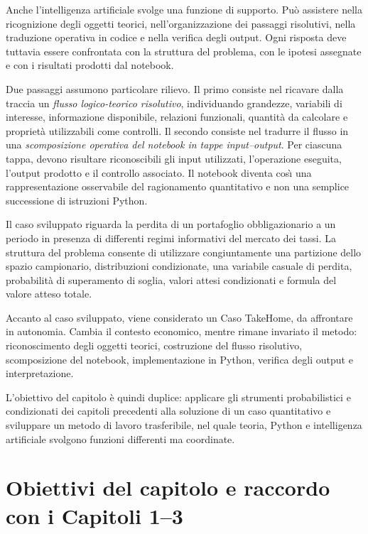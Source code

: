 Anche l'intelligenza artificiale svolge una funzione di supporto. Pu\`{o}
assistere nella ricognizione degli oggetti teorici, nell'organizzazione dei
passaggi risolutivi, nella traduzione operativa in codice e nella verifica
degli output. Ogni risposta deve tuttavia essere confrontata con la struttura
del problema, con le ipotesi assegnate e con i risultati prodotti dal
notebook.

Due passaggi assumono particolare rilievo. Il primo consiste nel ricavare
dalla traccia un \emph{flusso logico-teorico risolutivo}, individuando
grandezze, variabili di interesse, informazione disponibile, relazioni
funzionali, quantit\`{a} da calcolare e propriet\`{a} utilizzabili come
controlli. Il secondo consiste nel tradurre il flusso in una
\emph{scomposizione operativa del notebook in tappe input--output}. Per
ciascuna tappa, devono risultare riconoscibili gli input utilizzati,
l'operazione eseguita, l'output prodotto e il controllo associato. Il notebook
diventa cos\`{\i} una rappresentazione osservabile del ragionamento
quantitativo e non una semplice successione di istruzioni Python.

Il caso sviluppato riguarda la perdita di un portafoglio obbligazionario a un
periodo in presenza di differenti regimi informativi del mercato dei tassi.
La struttura del problema consente di utilizzare congiuntamente una partizione
dello spazio campionario, distribuzioni condizionate, una variabile casuale
di perdita, probabilit\`{a} di superamento di soglia, valori attesi
condizionati e formula del valore atteso totale.

Accanto al caso sviluppato, viene considerato un Caso TakeHome, da affrontare
in autonomia. Cambia il contesto economico, mentre rimane invariato il metodo:
riconoscimento degli oggetti teorici, costruzione del flusso risolutivo,
scomposizione del notebook, implementazione in Python, verifica degli output e
interpretazione.

L'obiettivo del capitolo \`{e} quindi duplice: applicare gli strumenti
probabilistici e condizionati dei capitoli precedenti alla soluzione di un caso
quantitativo e sviluppare un metodo di lavoro trasferibile, nel quale teoria,
Python e intelligenza artificiale svolgono funzioni differenti ma coordinate.


\section{Obiettivi del capitolo e raccordo con i Capitoli 1--3}

